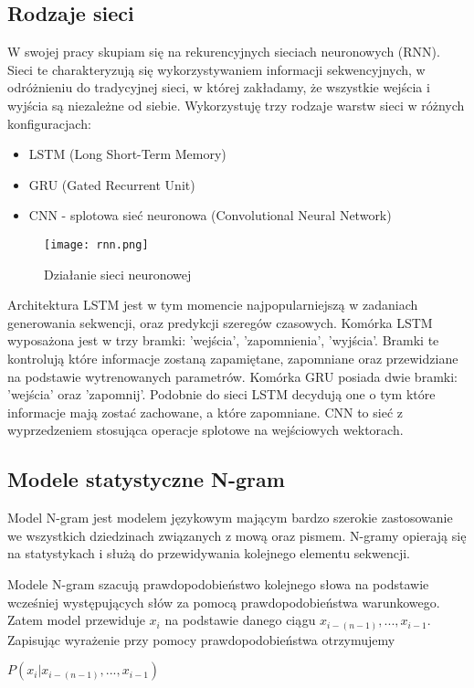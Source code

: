 \subsection {Rodzaje sieci}
W swojej pracy skupiam się na rekurencyjnych sieciach neuronowych (RNN). Sieci te charakteryzują się wykorzystywaniem informacji 
sekwencyjnych, w odróżnieniu do tradycyjnej sieci, w której zakładamy, że wszystkie wejścia i wyjścia są niezależne od siebie. Wykorzystuję
trzy rodzaje warstw sieci w różnych konfiguracjach: 
\begin{itemize}
    \item LSTM (Long Short-Term Memory)
    \item GRU (Gated Recurrent Unit)
    \item CNN - splotowa sieć neuronowa (Convolutional Neural Network)
\end{itemize}
\begin{figure}[!h]
	\caption{Działanie sieci neuronowej}
    \label{fig:rnn}
    \centering \texttt{[image: rnn.png]}
\end{figure}
Architektura LSTM jest w tym momencie najpopularniejszą w zadaniach generowania sekwencji, oraz predykcji szeregów czasowych. Komórka LSTM 
wyposażona jest w trzy bramki: 'wejścia',  'zapomnienia', 'wyjścia'. Bramki te kontrolują które informacje zostaną zapamiętane, zapomniane
oraz przewidziane na podstawie wytrenowanych parametrów. Komórka GRU posiada dwie bramki: 'wejścia' oraz 'zapomnij'. Podobnie do sieci LSTM 
decydują one o tym które informacje mają zostać zachowane, a które zapomniane. CNN to sieć z wyprzedzeniem stosująca operacje splotowe na wejściowych 
wektorach. 

\subsection{Modele statystyczne N-gram}
Model N-gram jest modelem językowym mającym bardzo szerokie zastosowanie we wszystkich dziedzinach związanych z mową oraz pismem. 
N-gramy opierają się na statystykach i służą do przewidywania kolejnego elementu sekwencji.

Modele N-gram szacują prawdopodobieństwo kolejnego słowa na podstawie wcześniej występujących słów za pomocą
prawdopodobieństwa warunkowego. Zatem model przewiduje \begin{math}x_i\end{math} na podstawie danego ciągu 
\begin{math}x_{i-(n-1)},...,x_{i-1}\end{math}. Zapisując wyrażenie przy pomocy prawdopodobieństwa otrzymujemy \\
\centerline{\begin{math}P(x_i|x_{i-(n-1)},...,x_{i-1})\end{math}}

